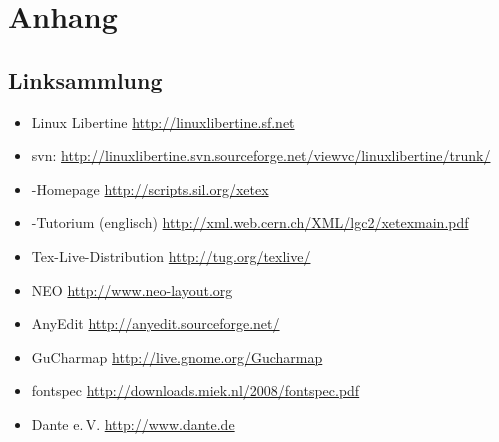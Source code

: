 \documentclass{fontdoku}
\begin{document}
%
%
%
%
%
%
%
%
%


\newpage
\section{Anhang}
\subsection{Linksammlung}

\begin{itemize}
   \item Linux Libertine \hfill\url{http://linuxlibertine.sf.net}
   \item svn: \hfill
         \url{http://linuxlibertine.svn.sourceforge.net/viewvc/linuxlibertine/trunk/}
   \item \XeTeX-Homepage \hfill\url{http://scripts.sil.org/xetex}
   \item \XeTeX-Tutorium (englisch) \hfill\url{http://xml.web.cern.ch/XML/lgc2/xetexmain.pdf}
   \item Tex-Live-Distribution \hfill\url{http://tug.org/texlive/}
   \item NEO \hfill\url{http://www.neo-layout.org}
   \item AnyEdit \hfill\url{http://anyedit.sourceforge.net/}
   \item GuCharmap \hfill\url{http://live.gnome.org/Gucharmap}
   \item fontspec \hfill\url{http://downloads.miek.nl/2008/fontspec.pdf}
   \item Dante e.\,V. \hfill\url{http://www.dante.de}
\end{itemize}
\end{document}
